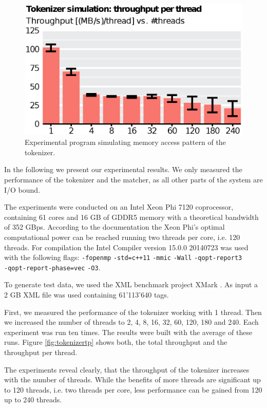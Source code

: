 \begin{figure}
    \includegraphics[scale=.45]{img/def/tokenizer_sim.eps} 
    \caption{Experimental program simulating memory access pattern of the
    tokenizer.}
    \label{fig:tokenizersim}
\end{figure}


In the following we present our experimental results. We only measured the
performance of the tokenizer and the matcher, as all other parts of the system
are I/O bound.

 The experiments were conducted on an Intel Xeon Phi
7120 coprocessor, containing 61 cores and 16 GB of GDDR5 memory with a
theoretical bandwidth of 352 GBps. According to the documentation the Xeon Phi's
optimal computational power can be reached running two threads per core, i.e.
120 threads. For compilation the Intel Compiler version 15.0.0 20140723 was used
with the following flags: \verb;-fopenmp; \verb;-std=c++11; \verb;-mmic;
\verb;-Wall; \verb;-qopt-report3; \\ \verb;-qopt-report-phase=vec; \verb;-O3;.

To generate test data, we used the XML benchmark project XMark
\cite{Schmidt2002}. As input a 2 GB XML file was used containing 61'113'640
tags. 

 First, we measured the performance of the tokenizer working
with 1 thread. Then we increased the number of threads to 2, 4, 8, 16, 32, 60,
120, 180 and 240. Each experiment was run ten times. The results were built
with the average of these runs. Figure \ref{fig:tokenizertp} shows both, the
total throughput and the throughput per thread.

The experiments reveal clearly, that the throughput of the tokenizer increases
with the number of threads. While the benefits of more threads are significant
up to 120 threads, i.e. two threads per core, less performance can be gained
from 120 up to 240 threads.

